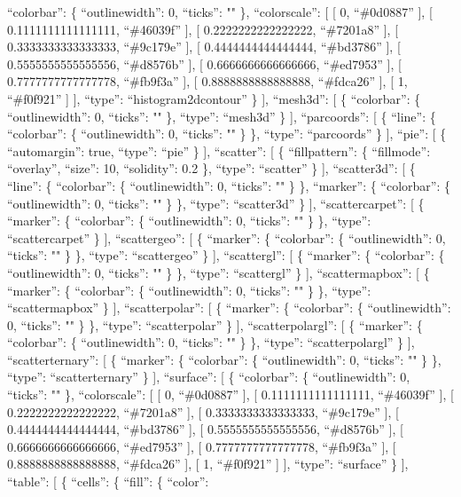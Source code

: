 \documentclass[
]{article}
\begin{document}
``colorbar'': \{ ``outlinewidth'': 0, ``ticks'': "" \}, ``colorscale'':
{[} {[} 0, ``\#0d0887'' {]}, {[} 0.1111111111111111, ``\#46039f'' {]},
{[} 0.2222222222222222, ``\#7201a8'' {]}, {[} 0.3333333333333333,
``\#9c179e'' {]}, {[} 0.4444444444444444, ``\#bd3786'' {]}, {[}
0.5555555555555556, ``\#d8576b'' {]}, {[} 0.6666666666666666,
``\#ed7953'' {]}, {[} 0.7777777777777778, ``\#fb9f3a'' {]}, {[}
0.8888888888888888, ``\#fdca26'' {]}, {[} 1, ``\#f0f921'' {]} {]},
``type'': ``histogram2dcontour'' \} {]}, ``mesh3d'': {[} \{
``colorbar'': \{ ``outlinewidth'': 0, ``ticks'': "" \}, ``type'':
``mesh3d'' \} {]}, ``parcoords'': {[} \{ ``line'': \{ ``colorbar'': \{
``outlinewidth'': 0, ``ticks'': "" \} \}, ``type'': ``parcoords'' \}
{]}, ``pie'': {[} \{ ``automargin'': true, ``type'': ``pie'' \} {]},
``scatter'': {[} \{ ``fillpattern'': \{ ``fillmode'': ``overlay'',
``size'': 10, ``solidity'': 0.2 \}, ``type'': ``scatter'' \} {]},
``scatter3d'': {[} \{ ``line'': \{ ``colorbar'': \{ ``outlinewidth'': 0,
``ticks'': "" \} \}, ``marker'': \{ ``colorbar'': \{ ``outlinewidth'':
0, ``ticks'': "" \} \}, ``type'': ``scatter3d'' \} {]},
``scattercarpet'': {[} \{ ``marker'': \{ ``colorbar'': \{
``outlinewidth'': 0, ``ticks'': "" \} \}, ``type'': ``scattercarpet'' \}
{]}, ``scattergeo'': {[} \{ ``marker'': \{ ``colorbar'': \{
``outlinewidth'': 0, ``ticks'': "" \} \}, ``type'': ``scattergeo'' \}
{]}, ``scattergl'': {[} \{ ``marker'': \{ ``colorbar'': \{
``outlinewidth'': 0, ``ticks'': "" \} \}, ``type'': ``scattergl'' \}
{]}, ``scattermapbox'': {[} \{ ``marker'': \{ ``colorbar'': \{
``outlinewidth'': 0, ``ticks'': "" \} \}, ``type'': ``scattermapbox'' \}
{]}, ``scatterpolar'': {[} \{ ``marker'': \{ ``colorbar'': \{
``outlinewidth'': 0, ``ticks'': "" \} \}, ``type'': ``scatterpolar'' \}
{]}, ``scatterpolargl'': {[} \{ ``marker'': \{ ``colorbar'': \{
``outlinewidth'': 0, ``ticks'': "" \} \}, ``type'': ``scatterpolargl''
\} {]}, ``scatterternary'': {[} \{ ``marker'': \{ ``colorbar'': \{
``outlinewidth'': 0, ``ticks'': "" \} \}, ``type'': ``scatterternary''
\} {]}, ``surface'': {[} \{ ``colorbar'': \{ ``outlinewidth'': 0,
``ticks'': "" \}, ``colorscale'': {[} {[} 0, ``\#0d0887'' {]}, {[}
0.1111111111111111, ``\#46039f'' {]}, {[} 0.2222222222222222,
``\#7201a8'' {]}, {[} 0.3333333333333333, ``\#9c179e'' {]}, {[}
0.4444444444444444, ``\#bd3786'' {]}, {[} 0.5555555555555556,
``\#d8576b'' {]}, {[} 0.6666666666666666, ``\#ed7953'' {]}, {[}
0.7777777777777778, ``\#fb9f3a'' {]}, {[} 0.8888888888888888,
``\#fdca26'' {]}, {[} 1, ``\#f0f921'' {]} {]}, ``type'': ``surface'' \}
{]}, ``table'': {[} \{ ``cells'': \{ ``fill'': \{ ``color'':
\end{document}
